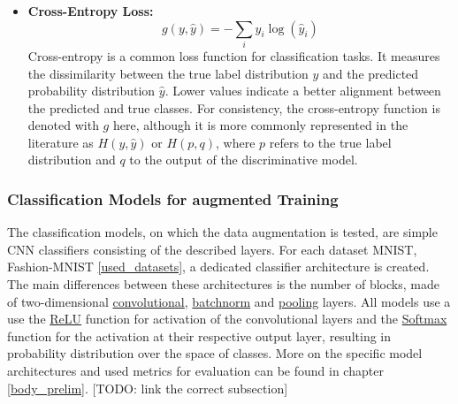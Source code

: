 \begin{itemize}
    \item \textbf{Cross-Entropy Loss:} \label{theoretical_loss_crossentropy}
    \begin{equation}
        g(y, \hat{y}) = -\sum_{i} y_i \log(\hat{y}_i)
    \end{equation}
    Cross-entropy is a common loss function for classification tasks. It measures the dissimilarity between the true label distribution \( y \) and the predicted probability distribution \( \hat{y} \). Lower values indicate a better alignment between the predicted and true classes. For consistency, the cross-entropy function is denoted with \( g \) here, although it is more commonly represented in the literature as \( H(y, \hat{y}) \) or \( H(p, q) \), where \( p \) refers to the true label distribution and \( q \) to the output of the discriminative model.


\end{itemize}

\subsubsection{Classification Models for augmented Training}
The classification models, on which the data augmentation is tested, are simple CNN classifiers consisting of the described layers. For each dataset MNIST, Fashion-MNIST \ref{used_datasets}, a dedicated classifier architecture is created. The main differences between these architectures is the number of blocks, made of two-dimensional \hyperref[theoretical_classification_conv_layers]{convolutional}, \hyperref[theoretical_classification_batchnorm_layers]{batchnorm} and \hyperref[theoretical_classification_pooling_layers]{pooling} layers. All models use a use the \hyperref[theoretical_activations_relu]{ReLU} function for activation of the convolutional layers and the \hyperref[theoretical_activations_softmax]{Softmax} function for the activation at their respective output layer, resulting in probability distribution over the space of classes. More on the specific model architectures and used metrics for evaluation can be found in chapter \ref{body_prelim}. [TODO: link the correct subsection]



